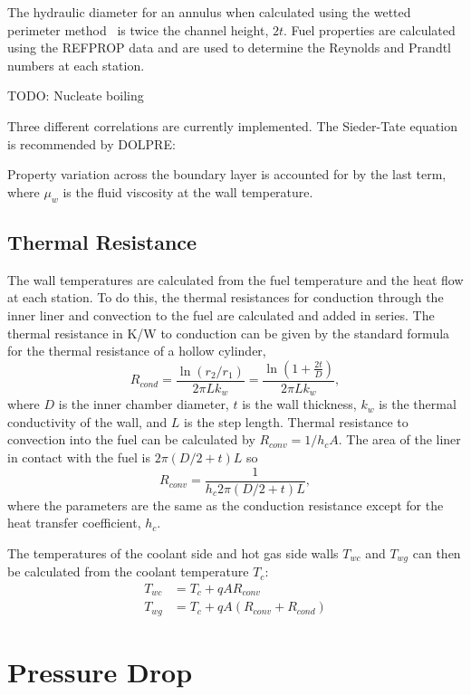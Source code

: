 \documentclass[11pt]{article}
\begin{document}
The hydraulic diameter for an annulus when calculated using the wetted perimeter method~\cite{bergman_fundamentals_2017} is twice the channel height, $2t$. Fuel properties are calculated using the REFPROP data and are used to determine the Reynolds and Prandtl numbers at each station.

TODO: Nucleate boiling

Three different correlations are currently implemented. The Sieder-Tate equation is recommended by DOLPRE:

Property variation across the boundary layer is accounted for by the last term, where $\mu_w$ is the fluid viscosity at the wall temperature.


\subsection{Thermal Resistance}
The wall temperatures are calculated from the fuel temperature and the heat flow at each station. To do this, the thermal resistances for conduction through the inner liner and convection to the fuel are calculated and added in series. The thermal resistance in K/W to conduction can be given by the standard formula for the thermal resistance of a hollow cylinder,
\begin{equation}
    R_{cond} = \frac{\ln{\left(r_2 / r_1\right)}}{2 \pi L k_w} = \frac{\ln{\left( 1 + \frac{2t}{D}\right)}}{2 \pi L k_w},
\end{equation}
where $D$ is the inner chamber diameter, $t$ is the wall thickness, $k_w$ is the thermal conductivity of the wall, and $L$ is the step length. Thermal resistance to convection into the fuel can be calculated by $R_{conv} = 1 / h_c A$. The area of the liner in contact with the fuel is $2 \pi (D / 2 + t) L $ so
\begin{equation}
    R_{conv} = \frac{1}{h_c 2 \pi (D/2 + t) L},
\end{equation}
where the parameters are the same as the conduction resistance except for the heat transfer coefficient, $h_c$.

The temperatures of the coolant side and hot gas side walls $T_{wc}$ and $T_{wg}$ can then be calculated from the coolant temperature $T_c$:
\begin{align}
  T_{wc} & = T_c + q A R_{conv} \\
  T_{wg} & = T_c + q A (R_{conv} + R_{cond})
\end{align}

\section{Pressure Drop}
\end{document}

